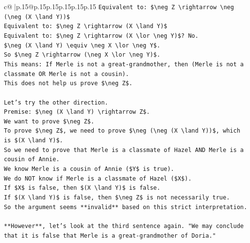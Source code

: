 \documentclass{article}
\begin{document}
{\begin{supertabular}{c@{$\;$}|p{.15\linewidth}@{}p{.15\linewidth}p{.15\linewidth}p{.15\linewidth}p{.15\linewidth}p{.15\linewidth}}
{{{\texttt{Equivalent to: \$\textbackslash{}neg Z \textbackslash{}rightarrow \textbackslash{}neg (\textbackslash{}neg (X \textbackslash{}land Y))\$} \\
\texttt{Equivalent to: \$\textbackslash{}neg Z \textbackslash{}rightarrow (X \textbackslash{}land Y)\$} \\
\texttt{Equivalent to: \$\textbackslash{}neg Z \textbackslash{}rightarrow (X \textbackslash{}lor \textbackslash{}neg Y)\$? No.} \\
\texttt{\$\textbackslash{}neg (X \textbackslash{}land Y) \textbackslash{}equiv \textbackslash{}neg X \textbackslash{}lor \textbackslash{}neg Y\$.} \\
\texttt{So \$\textbackslash{}neg Z \textbackslash{}rightarrow (\textbackslash{}neg X \textbackslash{}lor \textbackslash{}neg Y)\$.} \\
\texttt{This means: If Merle is not a great{-}grandmother, then (Merle is not a classmate OR Merle is not a cousin).} \\
\texttt{This does not help us prove \$\textbackslash{}neg Z\$.} \\
\\ 
\texttt{Let's try the other direction.} \\
\texttt{Premise: \$\textbackslash{}neg (X \textbackslash{}land Y) \textbackslash{}rightarrow Z\$.} \\
\texttt{We want to prove \$\textbackslash{}neg Z\$.} \\
\texttt{To prove \$\textbackslash{}neg Z\$, we need to prove \$\textbackslash{}neg (\textbackslash{}neg (X \textbackslash{}land Y))\$, which is \$(X \textbackslash{}land Y)\$.} \\
\texttt{So we need to prove that Merle is a classmate of Hazel AND Merle is a cousin of Annie.} \\
\texttt{We know Merle is a cousin of Annie (\$Y\$ is true).} \\
\texttt{We do NOT know if Merle is a classmate of Hazel (\$X\$).} \\
\texttt{If \$X\$ is false, then \$(X \textbackslash{}land Y)\$ is false.} \\
\texttt{If \$(X \textbackslash{}land Y)\$ is false, then \$\textbackslash{}neg Z\$ is not necessarily true.} \\
\texttt{So the argument seems **invalid** based on this strict interpretation.} \\
\\ 
\texttt{**However**, let's look at the third sentence again. "We may conclude that it is false that Merle is a great{-}grandmother of Doria."} \\
}}}
\end{supertabular}}
\end{document}
